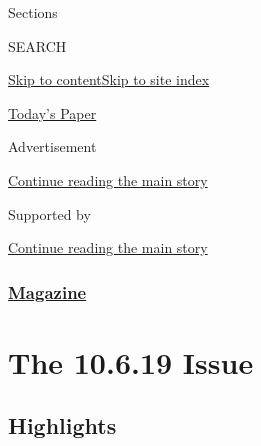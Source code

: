 Sections

SEARCH

\protect\hyperlink{site-content}{Skip to
content}\protect\hyperlink{site-index}{Skip to site index}

\href{https://myaccount.nytimes3xbfgragh.onion/auth/login?response_type=cookie\&client_id=vi}{}

\href{https://www.nytimes3xbfgragh.onion/section/todayspaper}{Today's
Paper}

Advertisement

\protect\hyperlink{after-top}{Continue reading the main story}

Supported by

\protect\hyperlink{after-sponsor}{Continue reading the main story}

\hypertarget{magazine}{%
\subsubsection{\texorpdfstring{\href{/section/magazine}{Magazine}}{Magazine}}\label{magazine}}

\hypertarget{the-10619-issue}{%
\section{The 10.6.19 Issue}\label{the-10619-issue}}

\hypertarget{highlights}{%
\subsection{Highlights}\label{highlights}}

